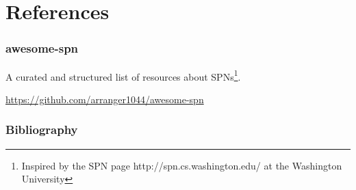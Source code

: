 \documentclass[10pt, t, xcolor={usenames,dvipsnames,svgnames}, compress]{beamer}
\begin{document}
\section{References}
{
  \begin{frame}[c]
    \sectionpage
  \end{frame}
}

\begin{frame}
  \frametitle{awesome-spn}
  A curated and structured list of resources about SPNs\footnote{Inspired by the
    SPN page {http://spn.cs.washington.edu/} at the Washington  University}.

  \url{https://github.com/arranger1044/awesome-spn}
\end{frame}

\begin{frame} [allowframebreaks]
  \frametitle{Bibliography}
  \setlength\bibitemsep{2pt}
  \printbibliography
\end{frame}
\end{document}
